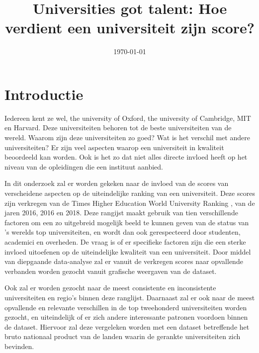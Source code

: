 \documentclass{uva-inf-article}
\title{Universities got talent: Hoe verdient een universiteit zijn score?}
\date{\today}
\begin{document}
\maketitle




\section*{Introductie}

Iedereen kent ze wel, the university of Oxford, the university of Cambridge, MIT en Harvard. Deze universiteiten behoren tot de beste universiteiten van de wereld. Waarom zijn deze universiteiten zo goed? Wat is het verschil met andere universiteiten? Er zijn veel aspecten waarop een universiteit in kwaliteit beoordeeld kan worden. Ook is het zo dat niet alles directe invloed heeft op het niveau van de opleidingen die een instituut aanbied.

In dit onderzoek zal er worden gekeken naar de invloed van de scores van verscheidene aspecten op de uiteindelijke ranking van een universiteit. Deze scores zijn verkregen van de Times Higher Education World University Ranking \cite{Times}, van de jaren 2016, 2016 en 2018. Deze rangijst maakt gebruik van tien verschillende factoren om een zo uitgebreid mogelijk beeld te kunnen geven van de status van 's werelds top universiteiten, en wordt dan ook gerespecteerd door studenten, academici en overheden. De vraag is of er specifieke factoren zijn die een sterke invloed uitoefenen op de uiteindelijke kwaliteit van een universiteit. Door middel van diepgaande data-analyse zal er vanuit de verkregen scores naar opvallende verbanden worden gezocht vanuit grafische weergaven van de dataset.


Ook zal er worden gezocht naar de meest consistente en inconsistente universiteiten en regio's binnen deze ranglijst. Daarnaast zal er ook naar de meest opvallende en relevante verschillen in de top tweehonderd universiteiten worden gezocht, en uiteindelijk of er zich andere interessante patronen voordoen binnen de dataset. Hiervoor zal deze vergeleken worden met een dataset betreffende het bruto nationaal product van de landen waarin de gerankte universiteiten zich bevinden.
\end{document}
